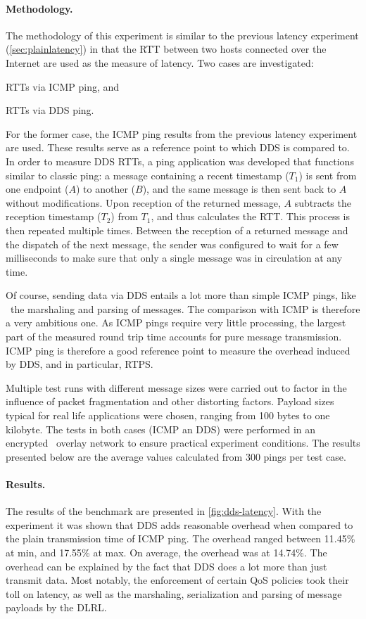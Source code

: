 \paragraph{Methodology.} The methodology of this experiment is similar to the previous latency experiment (\autoref{sec:plainlatency}) in that the RTT between two hosts connected over the Internet are used as the measure of latency. Two cases are investigated: 
\begin{inparaenum}[(i)]
	\item RTTs via ICMP ping, and
	\item RTTs via DDS ping.
\end{inparaenum}
For the former case, the ICMP ping results from the previous latency experiment are used. These results serve as a reference point to which DDS is compared to. In order to measure DDS RTTs, a ping application was developed that functions similar to classic ping: a message containing a recent timestamp ($T_1$) is sent from one endpoint ($A$) to another ($B$), and the same message is then sent back to $A$ without modifications. Upon reception of the returned message, $A$ subtracts the reception timestamp ($T_2$) from $T_1$, and thus calculates the RTT. This process is then repeated multiple times. Between the reception of a returned message and the dispatch of the next message, the sender was configured to wait for a few milliseconds to make sure that only a single message was in circulation at any time.

Of course, sending data via DDS entails a lot more than simple ICMP pings, like \eg\ the marshaling and parsing of messages. The comparison with ICMP is therefore a very ambitious one. As ICMP pings require very little processing, the largest part of the measured round trip time accounts for pure message transmission. ICMP ping is therefore a good reference point to measure the overhead induced by DDS, and in particular, RTPS. 

Multiple test runs with different message sizes were carried out to factor in the influence of packet fragmentation and other distorting factors. Payload sizes typical for real life applications were chosen, ranging from 100 bytes to one kilobyte. The tests in both cases (ICMP an DDS) were performed in an encrypted \wnet\ overlay network to ensure practical experiment conditions. The results presented below are the average values calculated from 300 pings per test case.


\paragraph{Results.} 
The results of the benchmark are presented in \autoref{fig:dds-latency}. With the experiment it was shown that DDS adds reasonable overhead when compared to the plain transmission time of ICMP ping. The overhead ranged between 11.45\% at min, and 17.55\% at max. On average, the overhead was at 14.74\%. The overhead can be explained by the fact that DDS does a lot more than just transmit data. Most notably, the enforcement of certain QoS policies took their toll on latency, as well as the marshaling, serialization and parsing of message payloads by the DLRL.


